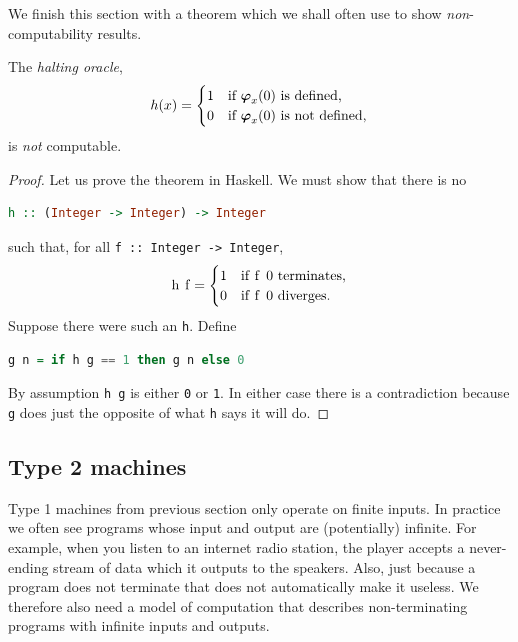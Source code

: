 We finish this section with a theorem which we shall often use to show
\emph{non}-computability results.

\begin{theorem}
  The \emph{halting oracle},
  \begin{equation*}
    h(x) =
    \begin{cases}
      1 & \text{if $\text{\boldmath{$\varphi$}}_{x}(0)$ is defined,}\\
      0 & \text{if $\text{\boldmath{$\varphi$}}_{x}(0)$ is not defined,}
    \end{cases}
  \end{equation*}
  is \emph{not} computable.
\end{theorem}

\begin{proof}
  Let us prove the theorem in Haskell. We must show that there is no
  \begin{lstlisting}[language=Haskell]
    h :: (Integer -> Integer) -> Integer
  \end{lstlisting}
  such that, for all \lstinline!f :: Integer -> Integer!,
  \begin{equation*}
    \text{\lstinline!h f!} =
    \begin{cases}
      \text{\lstinline!1!} & \text{if \lstinline!f 0! terminates,}\\
      \text{\lstinline!0!} & \text{if \lstinline!f 0! diverges.}
    \end{cases}
  \end{equation*}
  Suppose there were such an \lstinline!h!. Define
  \begin{lstlisting}[language=Haskell]
    g n = if h g == 1 then g n else 0
  \end{lstlisting}
  By assumption \lstinline!h g! is either \lstinline!0! or
  \lstinline!1!. In either case there is a contradiction because
  \lstinline!g! does just the opposite of what \lstinline!h! says it
  will do.
\end{proof}


\subsection{Type 2 machines}
\label{sec:type-2}

Type 1 machines from previous section only operate on finite inputs.
In practice we often see programs whose input and output are
(potentially) infinite. For example, when you listen to an internet
radio station, the player accepts a never-ending stream of data which
it outputs to the speakers. Also, just because a program does not
terminate that does not automatically make it useless. We therefore
also need a model of computation that describes non-terminating
programs with infinite inputs and outputs.

